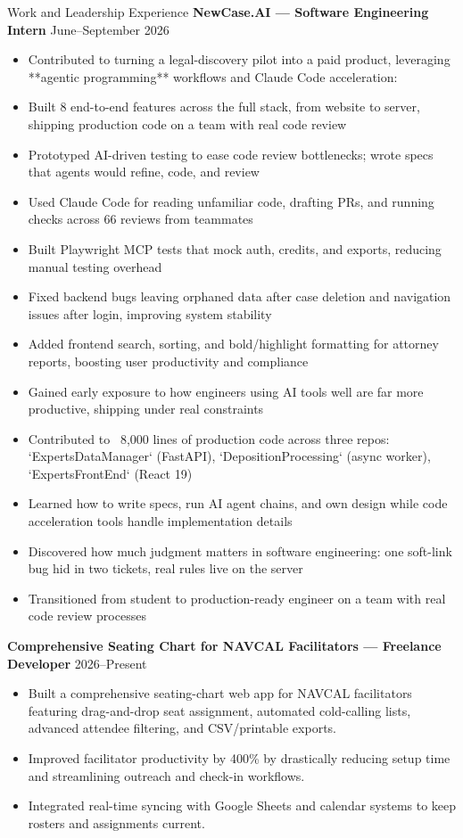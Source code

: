 \documentclass{resume}
\begin{document}
\begin{rSection}{Work and Leadership Experience}
\textbf{NewCase.AI — Software Engineering Intern} \hfill June–September 2026
\begin{itemize}
  \item Contributed to turning a legal-discovery pilot into a paid product, leveraging **agentic programming** workflows and Claude Code acceleration:
  \item Built 8 end-to-end features across the full stack, from website to server, shipping production code on a team with real code review
  \item Prototyped AI-driven testing to ease code review bottlenecks; wrote specs that agents would refine, code, and review
  \item Used Claude Code for reading unfamiliar code, drafting PRs, and running checks across 66 reviews from teammates
  \item Built Playwright MCP tests that mock auth, credits, and exports, reducing manual testing overhead
  \item Fixed backend bugs leaving orphaned data after case deletion and navigation issues after login, improving system stability
  \item Added frontend search, sorting, and bold/highlight formatting for attorney reports, boosting user productivity and compliance
  \item Gained early exposure to how engineers using AI tools well are far more productive, shipping under real constraints
  \item Contributed to ~8,000 lines of production code across three repos: `ExpertsDataManager` (FastAPI), `DepositionProcessing` (async worker), `ExpertsFrontEnd` (React 19)
\end{itemize}
\begin{itemize}
  \item Learned how to write specs, run AI agent chains, and own design while code acceleration tools handle implementation details
  \item Discovered how much judgment matters in software engineering: one soft-link bug hid in two tickets, real rules live on the server
  \item Transitioned from student to production-ready engineer on a team with real code review processes
\end{itemize}

\textbf{Comprehensive Seating Chart for NAVCAL Facilitators — Freelance Developer} \hfill 2026–Present
\begin{itemize}
  \item Built a comprehensive seating-chart web app for NAVCAL facilitators featuring drag-and-drop seat assignment, automated cold-calling lists, advanced attendee filtering, and CSV/printable exports.
  \item Improved facilitator productivity by 400\% by drastically reducing setup time and streamlining outreach and check-in workflows.
  \item Integrated real-time syncing with Google Sheets and calendar systems to keep rosters and assignments current.
\end{itemize}


\end{rSection}
\end{document}
